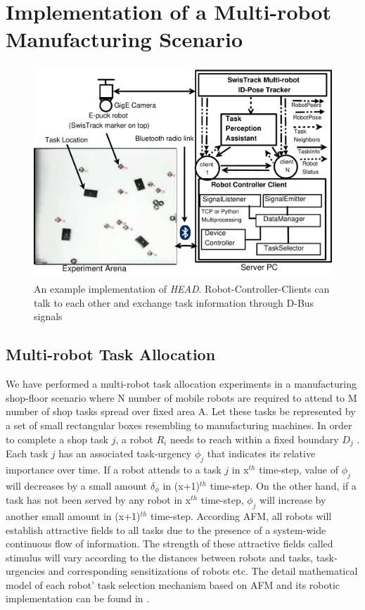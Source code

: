 \documentclass{ifacconf}
\begin{document}
\section{Implementation of a Multi-robot Manufacturing Scenario}
\label{sec:impl}
\begin{figure}
\begin{center}
\includegraphics[width=12cm,height=8cm]{./dia-files/RIL-Expt-Setup3}    %
\caption{An example implementation of {\em HEAD}. Robot-Controller-Clients can talk to each other and exchange task information through D-Bus signals} 
\label{fig:abstract-arch}
\end{center}
\end{figure}
\subsection{Multi-robot Task Allocation}
We have performed a multi-robot task allocation experiments in a manufacturing shop-floor scenario where N number of mobile robots are required to attend to M number of shop tasks spread over  fixed area A. Let these tasks be represented by a set of small rectangular boxes resembling to manufacturing machines. In order to complete a shop task $j$, a robot $R_i$ needs to reach within a fixed boundary $D_{j}$ . Each task $j$ has an associated task-urgency $\phi_j$ that indicates its relative importance over time. If a robot attends to a task $j$ in x$^{th}$ time-step, value of $\phi_j$ will decreases by a small amount $\delta_\phi$ in (x+1)$^{th}$ time-step. On the other hand, if a task has not been served by any robot in x$^{th}$ time-step, $\phi_j$ will increase by another small amount in (x+1)$^{th}$ time-step. According AFM, all robots will establish attractive fields to all tasks due to the presence of a system-wide continuous flow of information. The strength of these attractive fields called stimulus will vary according to the distances between robots and tasks, task-urgencies and corresponding sensitizations of robots etc. The detail mathematical model of each robot' task selection mechanism based on AFM and its robotic implementation can be found in \cite{Arcuate+2008,Sarker+2010ants}.
\end{document}

